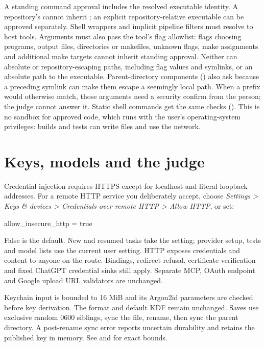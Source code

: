 A standing command approval includes the resolved executable identity. A
repository's  cannot inherit ; an explicit
repository-relative executable can be approved separately. Shell wrappers and
implicit pipeline filters must resolve to host tools. Arguments must also pass
the tool's flag allowlist: flags choosing programs, output files, directories or
makefiles, unknown flags, make assignments and additional make targets cannot
inherit standing approval. Neither can absolute or repository-escaping paths,
including flag values and symlinks, or an absolute path to the executable.
Parent-directory components () also ask because a preceding symlink
can make them escape a seemingly local path.
When a prefix would otherwise match, those arguments need a security confirm
from the person; the judge cannot answer it. Static shell commands get the same
checks (). This is no sandbox for approved code, which runs with the
user's operating-system privileges: builds and tests can write files and use
the network.

\chapter{Keys, models and the judge}

Credential injection requires HTTPS except for localhost and literal loopback
addresses. For a remote HTTP service you deliberately accept, choose
\emph{Settings > Keys \& devices > Credentials over remote HTTP > Allow HTTP}, or set:

\begin{txt}
[policy]
allow_insecure_http = true
\end{txt}

False is the default. New and resumed tasks take the setting; provider setup,
tests and model lists use the current user setting. HTTP exposes credentials and content
to anyone on the route. Bindings, redirect refusal, certificate verification and
fixed ChatGPT credential sinks still apply. Separate MCP, OAuth endpoint and
Google upload URL validators are unchanged.

Keychain input is bounded to 16 MiB and its Argon2id parameters are checked before
key derivation. The format and default KDF remain unchanged. Saves use exclusive
random 0600 siblings, sync the file, rename, then sync the parent directory. A
post-rename sync error reports uncertain durability and retains the published key
in memory. See  and  for exact bounds.



